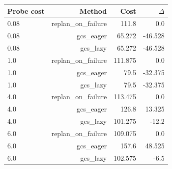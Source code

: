 \begin{tabular}{lrrr}
\toprule
Probe cost & Method & Cost & $\Delta$ \\
\midrule
0.08 & replan\_on\_failure & 111.8 & 0.0 \\
0.08 & gcs\_eager & 65.272 & -46.528 \\
0.08 & gcs\_lazy & 65.272 & -46.528 \\
1.0 & replan\_on\_failure & 111.875 & 0.0 \\
1.0 & gcs\_eager & 79.5 & -32.375 \\
1.0 & gcs\_lazy & 79.5 & -32.375 \\
4.0 & replan\_on\_failure & 113.475 & 0.0 \\
4.0 & gcs\_eager & 126.8 & 13.325 \\
4.0 & gcs\_lazy & 101.275 & -12.2 \\
6.0 & replan\_on\_failure & 109.075 & 0.0 \\
6.0 & gcs\_eager & 157.6 & 48.525 \\
6.0 & gcs\_lazy & 102.575 & -6.5 \\
\bottomrule
\end{tabular}
